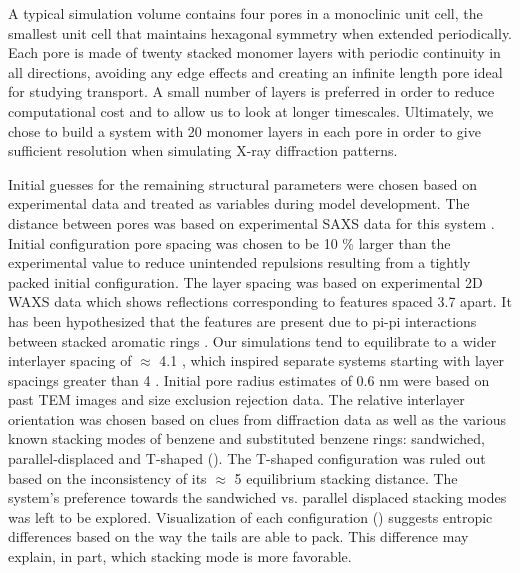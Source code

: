 A typical simulation volume contains four pores in a monoclinic unit cell,
the smallest unit cell that maintains hexagonal symmetry when extended 
periodically. Each pore is made of twenty stacked monomer layers with
periodic continuity in all directions, avoiding any edge effects and 
creating an infinite length pore ideal for studying transport. A small
number of layers is preferred in order to reduce computational cost and 
to allow us to look at longer timescales. Ultimately, we chose to build a system
with 20 monomer layers in each pore in order to give sufficient
resolution when simulating X-ray diffraction patterns.  %


Initial guesses for the remaining structural parameters were chosen
based on experimental data and treated as variables during model
development. The distance between pores was based on experimental SAXS
data for this system \cite{feng_thin_2016}. Initial configuration pore
spacing was chosen to be 10 \% larger than the experimental value to reduce
unintended repulsions resulting from a tightly packed initial configuration. 
The layer spacing was based on experimental 2D WAXS data which shows
reflections corresponding to features spaced 3.7 \angstrom apart. It has 
been hypothesized that the features are present due to pi-pi
interactions between stacked aromatic rings \cite{feng_scalable_2014}. 
Our simulations tend to equilibrate to a wider interlayer spacing of $\approx$ 4.1 \angstrom,
which inspired separate systems starting with layer spacings greater than
 4 \angstrom. Initial pore radius estimates of 0.6 nm were based on past TEM 
images and size exclusion rejection data\cite{feng_scalable_2014,
feng_thin_2016,zhou_supported_2005}.
The relative interlayer orientation was chosen based on clues from diffraction
data as well as the various known stacking modes of benzene and substituted 
benzene rings: sandwiched, parallel-displaced and T-shaped 
(). The T-shaped 
configuration was ruled out based on the inconsistency of its $\approx$ 
5 \angstrom equilibrium stacking distance. The system's preference
towards the sandwiched vs. parallel displaced stacking modes was left
to be explored. Visualization of each configuration 
() suggests 
entropic differences based on the way the tails are able to pack. 
This difference may explain, in part, which stacking mode is more favorable.

